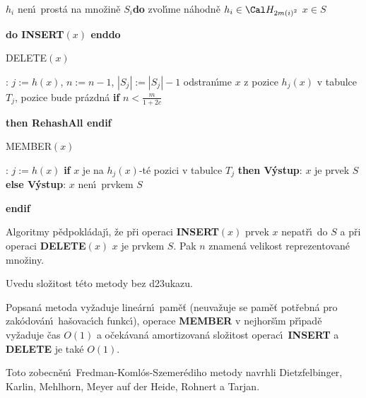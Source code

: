\phantom{---}{\bf while} $h_i$ nen\'\i\ prost\'a na mno\v zin\v e $
S_i${\bf do}\newline
\phantom{------}zvol\'\i me n\'ahodn\v e $h_i\in \Cal H_{2m\left(i\right)^2}$\newline
\phantom{---}{\bf enddo\newline 
enddo\newline 
for every} $x\in S$ {\bf do INSERT$\left(x\right)$ enddo
\bigskip

\flushpar DELETE$\left(x\right)$}:\newline 
$j:=h\left(x\right)$, $n:=n-1$, $|S_j|:=|S_j|-1$\newline 
odstran\'\i me $x$ z pozice $h_j\left(x\right)$ v tabulce $T_j$, pozice bude pr\'azdn\'a \newline 
{\bf if} $n<\frac m{1+2c}$ {\bf then RehashAll endif
\bigskip

\flushpar MEMBER$\left(x\right)$}: \newline 
$j:=h\left(x\right)$\newline 
{\bf if} $x$ je na $h_j\left(x\right)$-t\'e pozici v tabulce $T_j$ {\bf then\newline 
\phantom{{\rm ---}}V\'ystup}: $x$ je prvek $S$ \newline 
{\bf else\newline 
\phantom{{\rm ---}}V\'ystup}: $x$ nen\'\i\ prvkem $S$\newline 
{\bf endif
\bigskip

}\flushpar Algoritmy p\v edpokl\'adaj\'\i , \v ze p\v ri operaci {\bf INSERT$
\left(x\right)$  }
prvek $x$ nepat\v r\'\i\ do $S$ a p\v ri operaci {\bf DELETE$\left(x\right)$} $
x$ je prvkem $S$. 
Pak $n$ znamen\'a velikost reprezentovan\'e mno\v ziny. 
\medskip

\flushpar Uvedu slo\v zitost t\'eto metody bez d\accent23ukazu.
\medskip

Popsan\'a metoda vy\v zaduje line\'arn\'\i\ pam\v e\v t 
(neuva\v zuje se pam\v e\v t pot\v rebn\'a pro zak\'odo\-v\'a\-n\'\i\ ha\v sovac\'\i ch funkc\'\i ), operace {\bf MEMBER }
v nej\-hor\v s\'\i m p\v r\'\i pad\v e vy\v zaduje \v cas $O\left(1\right)$ a o\v cek\'avan\'a 
amortizovan\'a slo\v zitost operac\'\i\ {\bf INSERT} a {\bf DELETE} je tak\'e $
O\left(1\right)$.
\endproclaim

\flushpar Toto zobecn\v en\'\i\ Fredman-Koml\'os-Szemer\'ediho metody navrhli 
Dietzfelbinger, Karlin, Mehl\-horn, Meyer auf der Heide, Rohnert 
a Tarjan.
\bigskip

